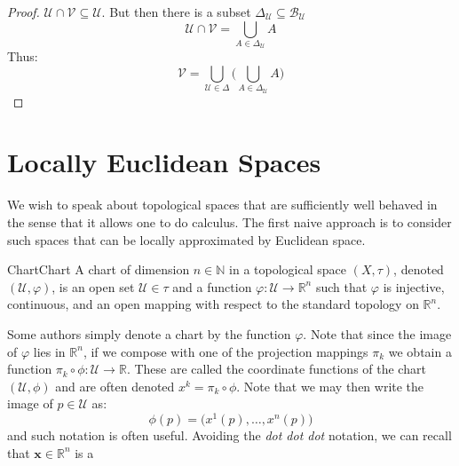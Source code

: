 \begin{proof}
                $\mathcal{U}\cap\mathcal{V}\subseteq\mathcal{U}$. But then there
                is a subset
                $\Delta_{\mathcal{U}}\subseteq\mathscr{B}_{\mathcal{U}}$
                \begin{equation}
                    \mathcal{U}\cap\mathcal{V}=
                    \bigcup_{A\in\Delta_{\mathcal{U}}}A
                \end{equation}
                Thus:
                \begin{equation}
                    \mathcal{V}=\bigcup_{\mathcal{U}\in\Delta}\Big(
                        \bigcup_{A\in\Delta_{\mathcal{U}}}A\Big)
                \end{equation}
        \end{proof}
\section{Locally Euclidean Spaces}
        We wish to speak about topological spaces that are sufficiently well
        behaved in the sense that it allows one to do calculus. The first
        naive approach is to consider such spaces that can be locally
        approximated by Euclidean space.
        \begin{fdefinition}{Chart}{Chart}
            A chart of dimension $n\in\mathbb{N}$ in a topological space
            $(X,\tau)$, denoted $(\mathcal{U},\varphi)$, is an open set
            $\mathcal{U}\in\tau$ and a function
            $\varphi:\mathcal{U}\rightarrow\mathbb{R}^{n}$ such that
            $\varphi$ is injective, continuous, and an open mapping with
            respect to the standard topology on $\mathbb{R}^{n}$.
        \end{fdefinition}
        Some authors simply denote a chart by the function $\varphi$. Note
        that since the image of $\varphi$ lies in $\mathbb{R}^{n}$, if we
        compose with one of the projection mappings $\pi_{k}$ we obtain a
        function $\pi_{k}\circ\phi:\mathcal{U}\rightarrow\mathbb{R}$. These
        are called the coordinate functions of the chart
        $(\mathcal{U},\phi)$ and are often denoted $x^{k}=\pi_{k}\circ\phi$.
        Note that we may then write the image of $p\in\mathcal{U}$ as:
        \begin{equation}
            \phi(p)=\big(x^{1}(p),\dots,x^{n}(p)\big)
        \end{equation}
        and such notation is often useful. Avoiding the \textit{dot dot dot}
        notation, we can recall that $\mathbf{x}\in\mathbb{R}^{n}$ is a
